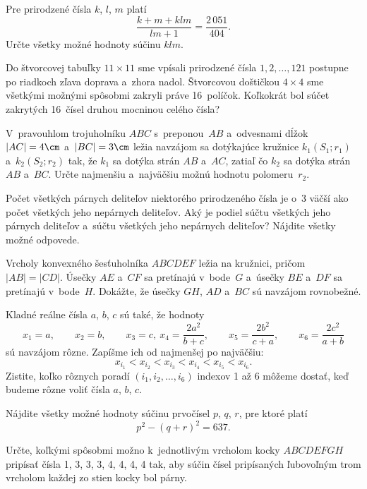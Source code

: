 {%
Pre prirodzené čísla $k$, $l$, $m$ platí
$$
\frac {k+m+klm} {lm+1} = \frac {2\,051} {404}.
$$
Určte všetky možné hodnoty súčinu $klm$.
}

{%
Do štvorcovej tabuľky $11 \times 11$ sme vpísali prirodzené čísla
$1, 2, \dots, 121$ postupne po riadkoch zľava doprava a~zhora nadol. Štvorcovou
doštičkou $4 \times 4$ sme všetkými možnými spôsobmi zakryli práve 16~políčok.
Koľkokrát bol súčet zakrytých 16~čísel druhou mocninou celého čísla?
}

{%
V~pravouhlom trojuholníku $ABC$ s~preponou~$AB$ a~odvesnami dĺžok
$|AC| = 4\cm$ a~$|BC| = 3\cm$
ležia navzájom sa dotýkajúce kružnice $k_1 (S_1; r_1)$
a~$k_2 (S_2; r_2)$ tak, že $k_1$ sa dotýka
strán $AB$ a~$AC$, zatiaľ čo $k_2$ sa dotýka strán $AB$ a~$BC$.
Určte najmenšiu a~najväčšiu možnú hodnotu polomeru~$r_2$.
}

{%
Počet všetkých párnych deliteľov niektorého prirodzeného čísla je o~3
väčší ako počet všetkých jeho nepárnych deliteľov. Aký je podiel súčtu
všetkých jeho párnych deliteľov a~súčtu všetkých jeho nepárnych deliteľov?
Nájdite všetky možné odpovede.
}

{%
Vrcholy konvexného šesťuholníka $ABCDEF$ ležia na kružnici, pričom
$|AB| = |CD|$. Úsečky $AE$ a~$CF$ sa pretínajú v~bode~$G$ a~úsečky $BE$ a~$DF$
sa pretínajú v~bode~$H$.
Dokážte, že úsečky $GH$, $AD$ a~$BC$ sú navzájom rovnobežné.
}

{%
Kladné reálne čísla $a$, $b$, $c$ sú také, že hodnoty
$$
x_1 = a, \qquad x_2 = b, \qquad x_3 = c, \
x_4 = \frac {2a^2} {b+c}, \qquad x_5 = \frac {2b^2} {c+a}, \qquad x_6 = \frac {2c^2} {a+b}
$$
sú navzájom rôzne. Zapíšme ich od najmenšej po najväčšiu:
$$
x_{i_1} <x_{i_2} <x_{i_3} <x_{i_4} <x_{i_5} <x_{i_6}.
$$
Zistite, koľko rôznych poradí $(i_1, i_2, \dots, i_6)$ indexov 1 až 6
môžeme dostať, keď budeme rôzne voliť čísla $a$, $b$, $c$.
}

{%
Nájdite všetky možné hodnoty súčinu prvočísel $p$, $q$, $r$,
pre ktoré platí
$$
p^2-(q+r)^2 = 637.
$$
}

{%
Určte, koľkými spôsobmi možno k~jednotlivým vrcholom kocky $ABCDEFGH$ pripísať
čísla 1, 3, 3, 3, 4, 4, 4, 4 tak, aby
súčin čísel pripísaných ľubovoľným trom vrcholom každej zo stien kocky
bol párny.
}

